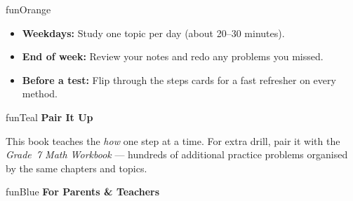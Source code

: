 {\begin{center}
\begin{minipage}{0.84\textwidth}
\begin{stInfoPanel}{funOrange}
    \vspace{3mm}

    \begin{itemize}[leftmargin=1.2em, itemsep=2pt]
        \item[\textcolor{funOrangeDark}{\faAngleDoubleRight}]
            \textbf{Weekdays:} Study one topic per day
            (about 20--30 minutes).
        \item[\textcolor{funOrangeDark}{\faAngleDoubleRight}]
            \textbf{End of week:} Review your notes and redo any
            problems you missed.
        \item[\textcolor{funOrangeDark}{\faAngleDoubleRight}]
            \textbf{Before a test:} Flip through the steps cards
            for a fast refresher on every method.
    \end{itemize}
\end{stInfoPanel}
\end{minipage}
\end{center}

\vspace{4mm}

\begin{center}
\begin{minipage}{0.84\textwidth}
\begin{stInfoPanel}{funTeal}
    {\bfseries\color{funTealDark}\faLink\hspace{2mm}Pair It Up}

    \vspace{2mm}

    This book teaches the \emph{how} one step at a time. For extra
    drill, pair it with the \textit{Grade~7 Math Workbook} ---
    hundreds of additional practice problems organised by the same
    chapters and topics.
\end{stInfoPanel}
\end{minipage}
\end{center}

\vspace{4mm}

\begin{center}
\begin{minipage}{0.84\textwidth}
\begin{stInfoPanel}{funBlue}
    {\bfseries\color{funBlueDark}\faUsers\hspace{2mm}For Parents \& Teachers}


\end{stInfoPanel}
\end{minipage}
\end{center}}
